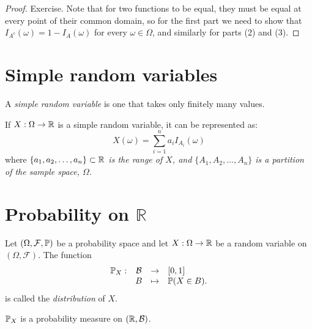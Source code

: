 \begin{proof}
Exercise. Note that for two functions to be equal, they must be equal at every point of their common domain, so for the first part we need to show that $I_{A^c}(\omega) = 1-I_A(\omega)$ for every $\omega\in\Omega$, and similarly for parts (2) and (3).
\end{proof}

\section{Simple random variables}

\begin{definition}
A \emph{simple random variable} is one that takes only finitely many values.
\end{definition}

If $X:\Omega\to\mathbb{R}$ is a simple random variable, it can be represented as:
\[
X(\omega)= \sum_{i=1}^n a_i I_{A_i}(\omega)
\]
where
\bit
\it $\{a_1,a_2,\ldots,a_n\}\subset\mathbb{R}$ is the range of $X$, and 
\it $\{A_1,A_2,\ldots,A_n\}$ is a partition of the sample space, $\Omega$.
\eit

\section{Probability on $\mathbb{R}$}

\begin{definition}
Let $(\Omega,\mathcal{F},\mathbb{P})$ be a probability space and let $X:\Omega\to\mathbb{R}$ be a random variable on $(\Omega,\mathcal{F})$. The function 
\[
\begin{array}{rccl}
	\mathbb{P}_X:	& \mathcal{B}	& \to 		& [0,1] \\
				& B				& \mapsto 	& \mathbb{P}(X\in B).
\end{array}
\]
is called the \emph{distribution} of $X$.
\end{definition}

\begin{theorem}
$\mathbb{P}_X$ is a probability measure on $(\mathbb{R},\mathcal{B})$.
\end{theorem}

